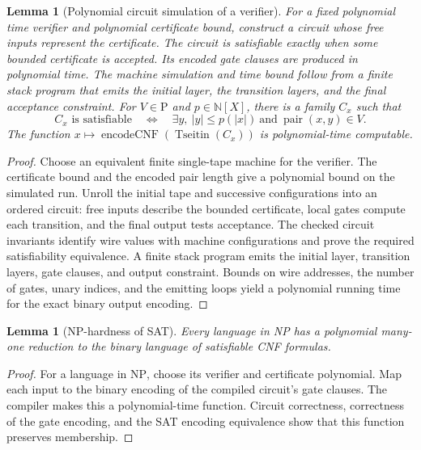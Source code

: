 \documentclass[11pt]{article}
\newtheorem{lemma}[theorem]{Lemma}
\theoremstyle{definition}
\begin{document}
\begin{lemma}[Polynomial circuit simulation of a verifier]\leavevmode
For a fixed polynomial time verifier and polynomial certificate bound,
construct a circuit whose free inputs represent the certificate. The circuit
is satisfiable exactly when some bounded certificate is accepted. Its encoded
gate clauses are produced in polynomial time. The machine simulation and
time bound follow from a finite stack program that emits the initial layer,
the transition layers, and the final acceptance constraint.
For $V\in\mathrm P$ and $p\in\mathbb N[X]$, there is a family $C_x$ such that
\[C_x\text{ is satisfiable}\quad\Longleftrightarrow\quad
\exists y,\ |y|\leq p(|x|)\ \text{and}\ \operatorname{pair}(x,y)\in V.\]
The function $x\mapsto\operatorname{encodeCNF}(\operatorname{Tseitin}(C_x))$ is polynomial-time computable.
\end{lemma}
\begin{proof}\leavevmode
Choose an equivalent finite single-tape machine for the verifier. The certificate bound and the encoded pair length give a polynomial bound on the simulated run. Unroll the initial tape and successive configurations into an ordered circuit: free inputs describe the bounded certificate, local gates compute each transition, and the final output tests acceptance. The checked circuit invariants identify wire values with machine configurations and prove the required satisfiability equivalence. A finite stack program emits the initial layer, transition layers, gate clauses, and output constraint. Bounds on wire addresses, the number of gates, unary indices, and the emitting loops yield a polynomial running time for the exact binary output encoding.\qedhere
\end{proof}

\begin{lemma}[NP-hardness of SAT]\leavevmode
Every language in NP has a polynomial many-one reduction to the binary
language of satisfiable CNF formulas.

\end{lemma}
\begin{proof}\leavevmode
For a language in $\mathrm{NP}$, choose its verifier and certificate polynomial. Map each input to the binary encoding of the compiled circuit's gate clauses. The compiler makes this a polynomial-time function. Circuit correctness, correctness of the gate encoding, and the SAT encoding equivalence show that this function preserves membership.\qedhere
\end{proof}
\end{document}
